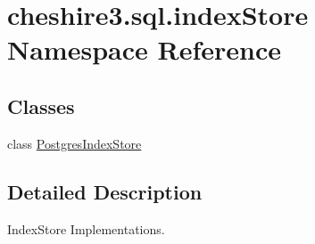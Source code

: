 \hypertarget{namespacecheshire3_1_1sql_1_1index_store}{\section{cheshire3.\-sql.\-index\-Store Namespace Reference}
\label{namespacecheshire3_1_1sql_1_1index_store}
}
\subsection*{Classes}
\begin{DoxyCompactItemize}
\item 
class \hyperlink{classcheshire3_1_1sql_1_1index_store_1_1_postgres_index_store}{Postgres\-Index\-Store}
\end{DoxyCompactItemize}


\subsection{Detailed Description}
\begin{DoxyVerb}IndexStore Implementations.\end{DoxyVerb}
 